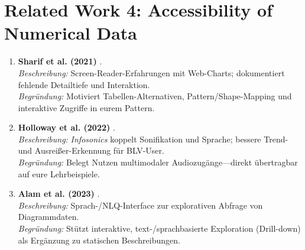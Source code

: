 \section{Related Work 4: Accessibility of Numerical Data}
\begin{enumerate}
  \item \textbf{Sharif et al. (2021)} \cite{Sharif2021DataVis}.\\
  \emph{Beschreibung:} Screen-Reader-Erfahrungen mit Web-Charts; dokumentiert fehlende Detailtiefe und Interaktion.\\
  \emph{Begründung:} Motiviert Tabellen-Alternativen, Pattern/Shape-Mapping und interaktive Zugriffe in eurem Pattern.
  
  \item \textbf{Holloway et al. (2022)} \cite{Holloway2022InfoSonics}.\\
  \emph{Beschreibung:} \emph{Infosonics} koppelt Sonifikation und Sprache; bessere Trend- und Ausreißer-Erkennung für BLV-User.\\
  \emph{Begründung:} Belegt Nutzen multimodaler Audiozugänge—direkt übertragbar auf eure Lehrbeispiele.
  
  \item \textbf{Alam et al. (2023)} \cite{Alam2023SeeChart}.\\
  \emph{Beschreibung:} Sprach-/NLQ-Interface zur explorativen Abfrage von Diagrammdaten.\\
  \emph{Begründung:} Stützt interaktive, text-/sprachbasierte Exploration (Drill-down) als Ergänzung zu statischen Beschreibungen.
\end{enumerate}

